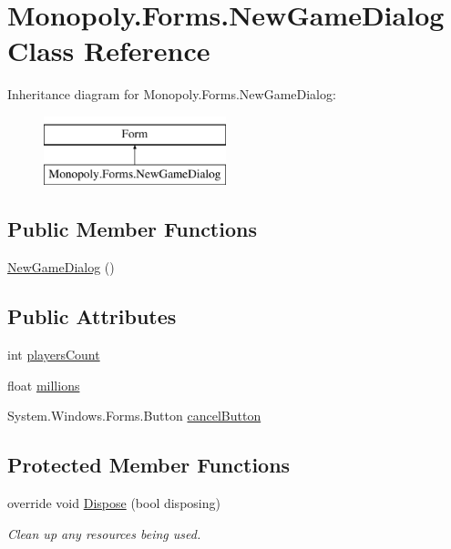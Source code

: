 \hypertarget{class_monopoly_1_1_forms_1_1_new_game_dialog}{}\section{Monopoly.\+Forms.\+New\+Game\+Dialog Class Reference}
\label{class_monopoly_1_1_forms_1_1_new_game_dialog}
Inheritance diagram for Monopoly.\+Forms.\+New\+Game\+Dialog\+:\begin{figure}[H]
\begin{center}
\leavevmode
\includegraphics[height=2.000000cm]{class_monopoly_1_1_forms_1_1_new_game_dialog}
\end{center}
\end{figure}
\subsection*{Public Member Functions}
\begin{DoxyCompactItemize}
\item 
\mbox{\hyperlink{class_monopoly_1_1_forms_1_1_new_game_dialog_a4f7b46bd7f9da79b1d0ceb288c64c199}{New\+Game\+Dialog}} ()
\end{DoxyCompactItemize}
\subsection*{Public Attributes}
\begin{DoxyCompactItemize}
\item 
int \mbox{\hyperlink{class_monopoly_1_1_forms_1_1_new_game_dialog_a709462d50b4f5612b7fd07ead8aa33a5}{players\+Count}}
\item 
float \mbox{\hyperlink{class_monopoly_1_1_forms_1_1_new_game_dialog_aa1145d7c096b3196a1868f808a5b50de}{millions}}
\item 
System.\+Windows.\+Forms.\+Button \mbox{\hyperlink{class_monopoly_1_1_forms_1_1_new_game_dialog_adf909135f644b9b54596d70cc080d6be}{cancel\+Button}}
\end{DoxyCompactItemize}
\subsection*{Protected Member Functions}
\begin{DoxyCompactItemize}
\item 
override void \mbox{\hyperlink{class_monopoly_1_1_forms_1_1_new_game_dialog_a6f3fde1647a3af41ab251bfa4ab750d5}{Dispose}} (bool disposing)
\begin{DoxyCompactList}\small\item\em Clean up any resources being used. \end{DoxyCompactList}\end{DoxyCompactItemize}


